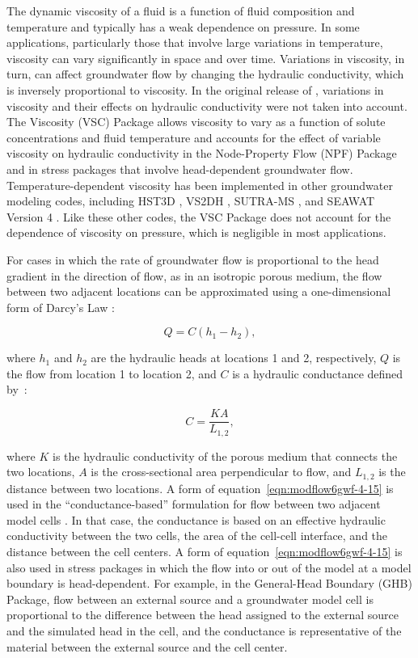
The dynamic viscosity of a fluid is a function of fluid composition and temperature and typically has a weak dependence on pressure. In some applications, particularly those that involve large variations in temperature, viscosity can vary significantly in space and over time. Variations in viscosity, in turn, can affect groundwater flow by changing the hydraulic conductivity, which is inversely proportional to viscosity. In the original release of \mf, variations in viscosity and their effects on hydraulic conductivity were not taken into account. The \mf Viscosity (VSC) Package allows viscosity to vary as a function of solute concentrations and fluid temperature and accounts for the effect of variable viscosity on hydraulic conductivity in the Node-Property Flow (NPF) Package and in stress packages that involve head-dependent groundwater flow. Temperature-dependent viscosity has been implemented in other groundwater modeling codes, including HST3D \citep{kipp1987}, VS2DH \citep{healy1996}, SUTRA-MS \citep{hughes2004}, and SEAWAT Version 4 \citep{langevin2008seawat}. Like these other codes, the VSC Package does not account for the dependence of viscosity on pressure, which is negligible in most applications.

For cases in which the rate of groundwater flow is proportional to the head gradient in the direction of flow, as in an isotropic porous medium, the flow between two adjacent locations can be approximated using a one-dimensional form of Darcy's Law \citep[equation 4-15]{modflow6gwf}:

\begin{equation}
\label{eqn:modflow6gwf-4-15}
Q = C \left( h_{1} - h_{2} \right),
\end{equation}

\noindent where $h_{1}$ and $h_{2}$ are the hydraulic heads at locations 1 and 2, respectively, $Q$ is the flow from location 1 to location 2, and $C$ is a hydraulic conductance defined by~\citep[equation 4-14]{modflow6gwf}:

\begin{equation}
\label{eqn:modflowgwf-4-14}
C = \frac{K A} {L_{1,2}},
\end{equation}

\noindent where $K$ is the hydraulic conductivity of the porous medium that connects the two locations, $A$ is the cross-sectional area perpendicular to flow, and $L_{1,2}$ is the distance between two locations. A form of equation~\ref{eqn:modflow6gwf-4-15} is used in the \mf ``conductance-based'' formulation for flow between two adjacent model cells \citep{modflow6gwf}. In that case, the conductance is based on an effective hydraulic conductivity between the two cells, the area of the cell-cell interface, and the distance between the cell centers. A form of equation~\ref{eqn:modflow6gwf-4-15} is also used in \mf stress packages in which the flow into or out of the model at a model boundary is head-dependent. For example, in the General-Head Boundary (GHB) Package, flow between an external source and a groundwater model cell is proportional to the difference between the head assigned to the external source and the simulated head in the cell, and the conductance is representative of the material between the external source and the cell center.

